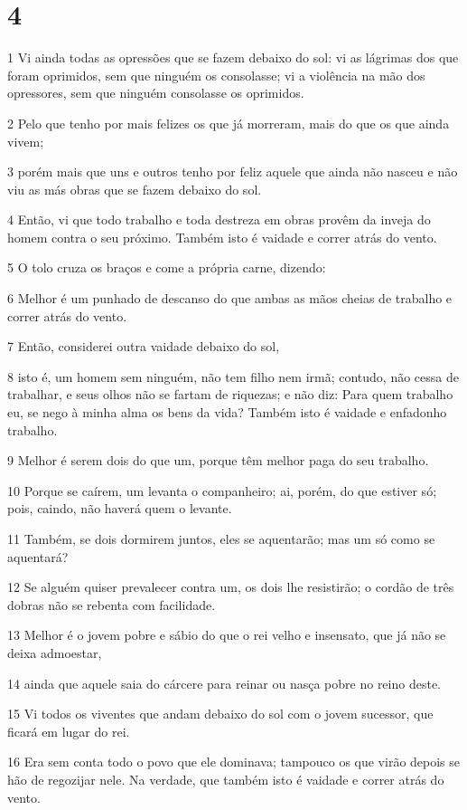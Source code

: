 \chapter{4}

\par 1 Vi ainda todas as opressões que se fazem debaixo do sol: vi as lágrimas dos que foram oprimidos, sem que ninguém os consolasse; vi a violência na mão dos opressores, sem que ninguém consolasse os oprimidos.
\par 2 Pelo que tenho por mais felizes os que já morreram, mais do que os que ainda vivem;
\par 3 porém mais que uns e outros tenho por feliz aquele que ainda não nasceu e não viu as más obras que se fazem debaixo do sol.
\par 4 Então, vi que todo trabalho e toda destreza em obras provêm da inveja do homem contra o seu próximo. Também isto é vaidade e correr atrás do vento.
\par 5 O tolo cruza os braços e come a própria carne, dizendo:
\par 6 Melhor é um punhado de descanso do que ambas as mãos cheias de trabalho e correr atrás do vento.
\par 7 Então, considerei outra vaidade debaixo do sol,
\par 8 isto é, um homem sem ninguém, não tem filho nem irmã; contudo, não cessa de trabalhar, e seus olhos não se fartam de riquezas; e não diz: Para quem trabalho eu, se nego à minha alma os bens da vida? Também isto é vaidade e enfadonho trabalho.
\par 9 Melhor é serem dois do que um, porque têm melhor paga do seu trabalho.
\par 10 Porque se caírem, um levanta o companheiro; ai, porém, do que estiver só; pois, caindo, não haverá quem o levante.
\par 11 Também, se dois dormirem juntos, eles se aquentarão; mas um só como se aquentará?
\par 12 Se alguém quiser prevalecer contra um, os dois lhe resistirão; o cordão de três dobras não se rebenta com facilidade.
\par 13 Melhor é o jovem pobre e sábio do que o rei velho e insensato, que já não se deixa admoestar,
\par 14 ainda que aquele saia do cárcere para reinar ou nasça pobre no reino deste.
\par 15 Vi todos os viventes que andam debaixo do sol com o jovem sucessor, que ficará em lugar do rei.
\par 16 Era sem conta todo o povo que ele dominava; tampouco os que virão depois se hão de regozijar nele. Na verdade, que também isto é vaidade e correr atrás do vento.

